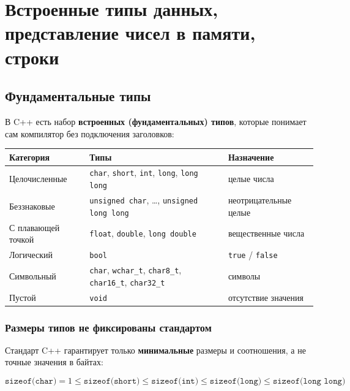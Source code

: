 
\section{Встроенные типы данных, представление чисел в памяти, строки}

\subsection{Фундаментальные типы}

В C++ есть набор \textbf{встроенных (фундаментальных) типов}, которые понимает
сам компилятор без подключения заголовков:

\begin{center}
\begin{tabular}{lll}
\toprule
\textbf{Категория} & \textbf{Типы} & \textbf{Назначение} \\
\midrule
Целочисленные & \texttt{char}, \texttt{short}, \texttt{int}, \texttt{long}, \texttt{long long} & целые числа \\
\addlinespace
Беззнаковые & \texttt{unsigned char}, \dots, \texttt{unsigned long long} & неотрицательные целые \\
\addlinespace
С плавающей точкой & \texttt{float}, \texttt{double}, \texttt{long double} & вещественные числа \\
\addlinespace
Логический & \texttt{bool} & \texttt{true} / \texttt{false} \\
\addlinespace
Символьный & \texttt{char}, \texttt{wchar\_t}, \texttt{char8\_t}, \texttt{char16\_t}, \texttt{char32\_t} & символы \\
\addlinespace
Пустой & \texttt{void} & отсутствие значения \\
\bottomrule
\end{tabular}
\end{center}

\subsubsection{Размеры типов не фиксированы стандартом}

Стандарт C++ гарантирует только \textbf{минимальные} размеры и соотношения, а не
точные значения в байтах:

\[
\texttt{sizeof(char)} = 1 \le \texttt{sizeof(short)} \le \texttt{sizeof(int)}
\le \texttt{sizeof(long)} \le \texttt{sizeof(long long)}
\]

